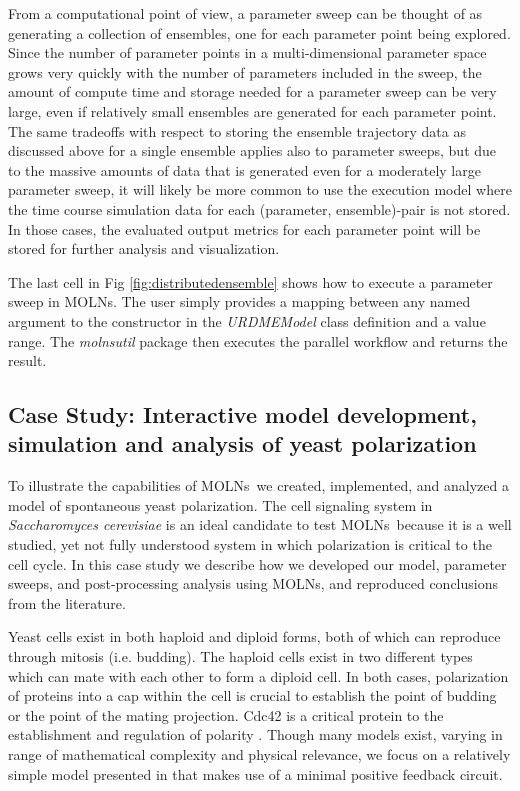 \documentclass[final,leqno,onefignum,onetabnum]{siamltex1213}
\def\packagename {MOLNs}
\begin{document}
From a computational point of view, a parameter sweep can be thought of as generating a collection of ensembles, one for each parameter point being explored. Since the number of parameter points in a multi-dimensional parameter space grows very quickly with the number of parameters included in the sweep, the amount of compute time and storage needed for a parameter sweep can be very large, even if relatively small ensembles are generated for each parameter point. The same tradeoffs with respect to storing the ensemble trajectory data as discussed above for a single ensemble applies also to parameter sweeps, but due to the massive amounts of data that is generated even for a moderately large parameter sweep, it will likely be more common to use the execution model where the time course simulation data for each (parameter, ensemble)-pair is not stored. In those cases, the evaluated output metrics for each parameter point will be stored for further analysis and visualization.  

The last cell in Fig \ref{fig:distributedensemble} shows how to execute a parameter sweep in \packagename.  The user simply provides a mapping between any named argument to the constructor in the \emph{URDMEModel} class definition and a value range. The \emph{molnsutil} package then executes the parallel workflow and returns the result. 



\subsection{Case Study: Interactive model development, simulation and analysis of yeast polarization}
\label{sec:CaseStudy}

To illustrate the capabilities of \packagename~we created, implemented, and analyzed a model of spontaneous yeast polarization. The cell signaling system in \emph{Saccharomyces cerevisiae} is an ideal candidate to test \packagename~because it is a well studied, yet not fully understood system in which polarization is critical to the cell cycle. In this case study we describe how we developed our model, parameter sweeps, and post-processing analysis using \packagename, and reproduced conclusions from the literature. 

Yeast cells exist in both haploid and diploid forms, both of which can reproduce through mitosis (i.e. budding). The haploid cells exist in two different types which can mate with each other to form a diploid cell. In both cases, polarization of proteins into a cap within the cell is crucial to establish the point of budding or the point of the mating projection.  Cdc42 is a critical protein to the establishment and regulation of polarity \cite{pruyne2000}. Though many models exist, varying in range of mathematical complexity and physical relevance, we focus on a relatively simple model presented in \cite{Altschuler2008, Altschuler2011} that makes use of a minimal positive feedback circuit.
\end{document}
